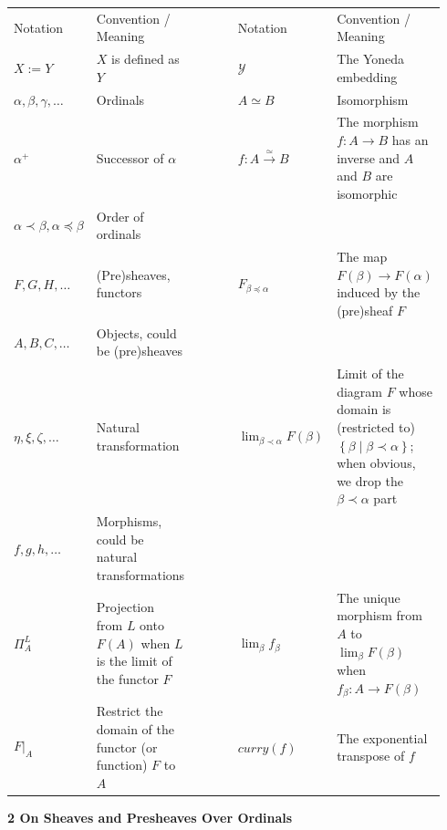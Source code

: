 \documentclass[10pt,a4paper]{article}
\begin{document}
\begin{center}\begin{tabular}{p{0.188\linewidth}p{0.188\linewidth}p{0.188\linewidth}p{0.188\linewidth}p{0.188\linewidth}}Notation & Convention / Meaning &  & Notation & Convention / Meaning\\$X:=Y$ & $X$ is defined as $Y$ &  & $\mathcal{Y}$ & The Yoneda embedding\\$\alpha,\beta,\gamma,\dots$ & Ordinals &  & $A\simeq B$ & Isomorphism\\${\alpha}^{+}$ & Successor of $\alpha$ &  & $f:A\xrightarrow{\simeq}B$ & The morphism $f:A\to B$ has an inverse and $A$ and $B$ are isomorphic\\$\alpha\prec\beta,\alpha\preceq\beta$ & Order of ordinals & \\$F,G,H,\dots$ & (Pre)sheaves, functors &  & $F_{\beta\preceq\alpha}$ & The map $F(\beta)\to F(\alpha)$  induced by the (pre)sheaf $F$\\$A,B,C,\dots$ & Objects, could be (pre)sheaves & \\$\eta,\xi,\zeta,\dots$ & Natural transformation &  & $\displaystyle\lim_{\beta\prec\alpha}F(\beta)$ & Limit of the diagram $F$ whose domain is (restricted to) $\left\{\beta\middle|\beta\prec\alpha\right\}$; when obvious, we drop the $\beta\prec\alpha$ part\\$f,g,h,\dots$ & Morphisms, could be natural transformations & \\$\Pi^{L}_{A}$ & Projection from $L$ onto $F(A)$ when $L$ is the limit of the functor $F$ &  & $\displaystyle\lim_{\beta}f_{\beta}$ & The unique morphism from $A$ to $\displaystyle\lim_{\beta}F(\beta)$ when $f_{\beta}:A\to F(\beta)$\\${\left.F\right|}_{A}$ & Restrict the domain of the functor (or function) $F$ to $A$ &  & $\mathit{curry}\left(f\right)$ & The exponential transpose of $f$\end{tabular}\end{center}
 
 
 
 


 
\par\medskip\noindent\textbf{2 On Sheaves and Presheaves Over Ordinals}\par
 
 
\end{document}

